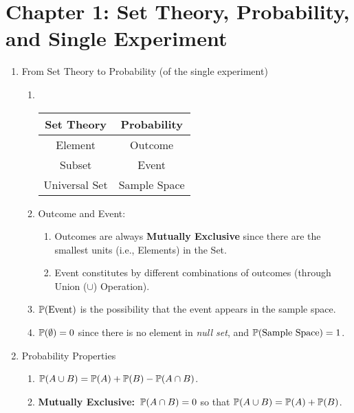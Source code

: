 \section*{Chapter 1: Set Theory, Probability, and Single Experiment}
\begin{enumerate}
    \item From Set Theory to Probability (of the single experiment)
    \begin{enumerate}
        \item~{
            \begin{center}
                \begin{tabular}{|c|c|}
                    \hline
                    \textbf{Set Theory} & \textbf{Probability} \\
                    \hline
                    \hline
                    Element & Outcome \\
                    \hline
                    Subset  & Event   \\
                    \hline
                    Universal Set & Sample Space \\
                    \hline
                \end{tabular}
            \end{center}
                        }
            \item Outcome and Event: {
                \begin{enumerate}
                    \item Outcomes are always \textbf{Mutually Exclusive} since there are the smallest units (i.e., Elements) in the Set.
                    \item Event constitutes by different combinations of outcomes (through Union ($\cup$) Operation).
                \end{enumerate}
            } 
            \item $\P{\text{Event}}$ is the possibility that the event appears in the sample space. 
            \item $\P{\emptyset}=0$ since there is no element in \textit{null set}, and $\P{\text{Sample Space}}=1$.
    \end{enumerate}
    \item Probability Properties
    \begin{enumerate}
        \item $\P{A \cup B} = \P{A}+\P{B}-\P{A\cap B}$.
        \item \textbf{Mutually Exclusive:}~$\P{A \cap B}=0$ so that $\P{A \cup B} = \P{A}+\P{B}$.

\end{enumerate}
\end{enumerate}
